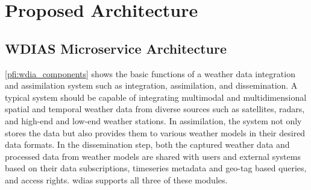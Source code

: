\documentclass[conference]{IEEEtran}
\begin{document}

\section{Proposed Architecture}
\label{pse:wdias_architecture}

\subsection{WDIAS Microservice Architecture}
\label{psubse:wdias_microservices}

\cref{pfi:wdia_components} shows the basic functions of a weather data integration and assimilation system such as integration, assimilation, and dissemination. A typical system should be capable of integrating multimodal and multidimensional spatial and temporal weather data from diverse sources such as satellites, radars, and high-end and low-end weather stations. In assimilation, the system not only stores the data but also provides them to various weather models in their desired data formats. In the dissemination step, both the captured weather data and processed data from weather models are shared with users and external systems based on their data subscriptions, timeseries metadata and geo-tag based queries, and access rights. \acrshort{wdias} supports all three of these modules.
\end{document}
